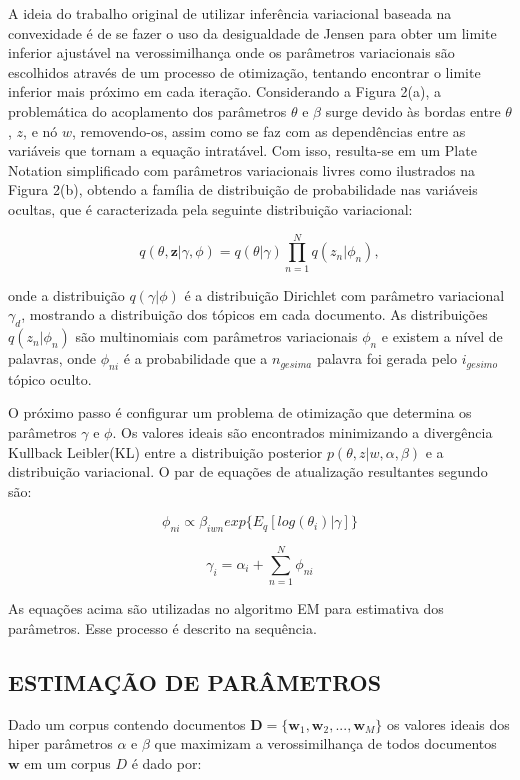 \documentclass[12pt,a4paper]{article}
\begin{document}
A ideia do trabalho original de utilizar inferência variacional baseada na convexidade é de se fazer o uso da desigualdade de Jensen para obter um limite inferior ajustável na verossimilhança \cite{jordan1999introduction} onde os parâmetros variacionais são escolhidos através de um processo de otimização,
 tentando encontrar o limite inferior mais próximo em cada iteração. Considerando a Figura 2(a), a problemática do acoplamento dos parâmetros $\theta$ e $\beta$ surge devido às bordas entre $\theta$, $z$,
 e nó $w$, removendo-os, assim como se faz com as dependências entre as variáveis que tornam a equação intratável. Com isso,
 resulta-se em um Plate Notation simplificado com parâmetros variacionais livres como ilustrados na Figura 2(b), obtendo a família de distribuição de probabilidade nas variáveis ocultas,
 que é caracterizada pela seguinte distribuição variacional:

\begin{equation}
q(\theta,\textbf{z}|\gamma,\phi)=q(\theta|\gamma)\prod_{n=1}^{N}q(z_n|\phi_n), 
\end{equation}

onde a distribuição  $q(\gamma|\phi)$ é a distribuição Dirichlet com parâmetro variacional $\gamma_d$, mostrando a distribuição dos tópicos em cada documento.
 As distribuições $q(z_n | \phi_n)$ são multinomiais com parâmetros variacionais $\phi_n$ e existem a nível de palavras, onde $\phi_{ni}$ é a probabilidade que a $n_{gesima}$ palavra foi gerada pelo $i_{gesimo}$ tópico oculto.

O próximo passo é configurar um problema de otimização que determina os parâmetros $\gamma$ e $\phi$. Os valores ideais são encontrados minimizando a divergência Kullback Leibler(KL) entre a distribuição posterior $p(\theta, z|w,\alpha,\beta)$ e a distribuição variacional.
 O par de equações de atualização resultantes segundo  são:

\begin{equation}
\phi_{ni} \propto \beta_{iwn} exp\{E_q[log(\theta_i)|\gamma]\}
\end{equation}

\begin{equation}
\gamma_i = \alpha_i + \sum_{n=1}^{N} \phi_{ni}
\end{equation}

As equações acima são utilizadas no algoritmo EM para estimativa dos parâmetros. Esse processo é descrito na sequência.

\subsection{ESTIMAÇÃO DE PARÂMETROS}
Dado um corpus contendo documentos $\textbf{D} = \{\textbf{w}_1, \textbf{w}_2, . . ., \textbf{w}_M\}$ os valores ideais dos hiper parâmetros $\alpha$ e $\beta$
 que maximizam a verossimilhança de todos documentos $\textbf{w}$ em um corpus $D$ é dado por:
\end{document}
